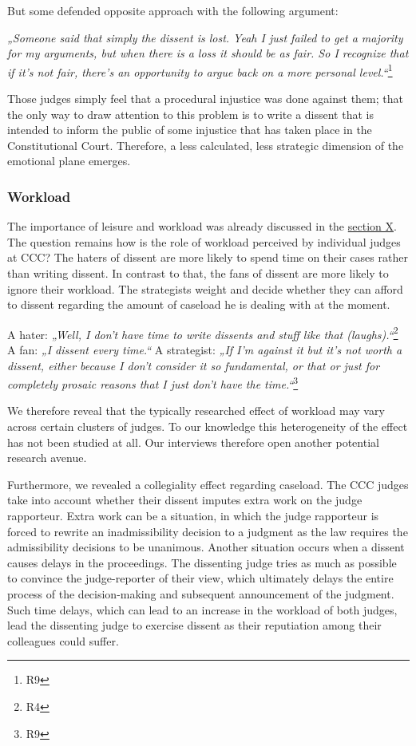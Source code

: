 \documentclass[
  11pt,
]{article}
\begin{document}
But some defended opposite approach with the following argument:

\emph{„Someone said that simply the dissent is lost. Yeah I just failed to get a majority for my arguments, but when there is a loss it should be as fair. So I recognize that if it's not fair, there's an opportunity to argue back on a more personal level.``}\footnote{R9}

Those judges simply feel that a procedural injustice was done against them; that the only way to draw attention to this problem is to write a dissent that is intended to inform the public of some injustice that has taken place in the Constitutional Court. Therefore, a less calculated, less strategic dimension of the emotional plane emerges.

\subsubsection{Workload}\label{workload}

The importance of leisure and workload was already discussed in the \hyperref[research]{section X}. The question remains how is the role of workload perceived by individual judges at CCC? The haters of dissent are more likely to spend time on their cases rather than writing dissent. In contrast to that, the fans of dissent are more likely to ignore their workload. The strategists weight and decide whether they can afford to dissent regarding the amount of caseload he is dealing with at the moment.

A hater: \emph{„Well, I don't have time to write dissents and stuff like that (laughs).``}\footnote{R4}
A fan: \emph{„I dissent every time.``}
A strategist: \emph{„If I'm against it but it's not worth a dissent, either because I don't consider it so fundamental, or that or just for completely prosaic reasons that I just don't have the time.``}\footnote{R9}

We therefore reveal that the typically researched effect of workload may vary across certain clusters of judges. To our knowledge this heterogeneity of the effect has not been studied at all. Our interviews therefore open another potential research avenue.

Furthermore, we revealed a collegiality effect regarding caseload. The CCC judges take into account whether their dissent imputes extra work on the judge rapporteur. Extra work can be a situation, in which the judge rapporteur is forced to rewrite an inadmissibility decision to a judgment as the law requires the admissibility decisions to be unanimous. Another situation occurs when a dissent causes delays in the proceedings. The dissenting judge tries as much as possible to convince the judge-reporter of their view, which ultimately delays the entire process of the decision-making and subsequent announcement of the judgment. Such time delays, which can lead to an increase in the workload of both judges, lead the dissenting judge to exercise dissent as their reputiation among their colleagues could suffer.
\end{document}
